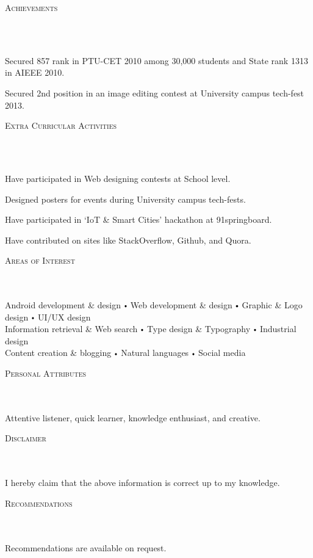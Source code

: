 \documentclass{article}
\newcommand{\header}[1]{{
\hspace*{-15pt}\vspace*{6pt} \textsc{#1}} \vspace*{-6pt} 
\lineunder
}
\newcommand{\lineunder}{
\vspace*{-8pt} \\ \hspace*{-18pt} 
\hrulefill \\
}
\newcommand{\content}{
\vspace*{2pt}%
}
\renewcommand{\labelitemi}{
$\vcenter{\hbox{\tiny$\bullet$}}$\hspace*{3pt}
}
\renewcommand{\labelitemii}{
$\vcenter{\hbox{\tiny$\bullet$}}$\hspace*{-3pt}
}
\newenvironment{bullet-list-major}{
\begin{list}{\labelitemii}{\setlength\leftmargin{3pt} 
\topsep 0pt \itemsep -2pt}}{\vspace*{4pt}\end{list}
}
\begin{document}
\vspace*{4pt}%
\header{Achievements}
    \begin{bullet-list-major}
    \item Secured 857 rank in PTU-CET 2010 among 30,000 students and State rank 1313 in AIEEE 2010.
    \item  Secured 2nd position in an image editing contest at University campus tech-fest 2013.
    \end{bullet-list-major}

\vspace*{4pt}%
\header{Extra Curricular Activities}
    \begin{bullet-list-major}
    \item  Have participated in Web designing contests at School level.
    \vspace{2pt}
    \item  Designed posters for events during University campus tech-fests.
    \vspace{2pt}
    \item  Have participated in `IoT \& Smart Cities' hackathon at 91springboard.
    \vspace{2pt}
    \item  Have contributed on sites like StackOverflow, Github, and Quora.
    \end{bullet-list-major}

\vspace*{4pt}%
\header{Areas of Interest}
    \content{Android development \& design \labelitemi Web development \& design \labelitemi Graphic \& Logo design \labelitemi UI/UX design \\ Information retrieval \& Web search \labelitemi Type design \& Typography \labelitemi Industrial design \\ Content creation \& blogging  \labelitemi Natural languages \labelitemi Social media \vspace{5pt}}

\vspace*{4pt}%
\header{Personal Attributes}
    \content{Attentive listener, quick learner, knowledge enthusiast, and creative.\vspace{5pt}}

\vspace*{4pt}%
\header{Disclaimer}
    \content{I hereby claim that the above information is correct up to my knowledge.\vspace{5pt}}

\vspace*{4pt}%
\header{Recommendations}
    \content{Recommendations are available on request.}
\end{document}
